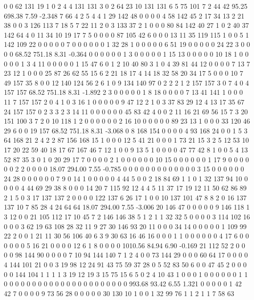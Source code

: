  0 0 62 131 19 1 0 2 4 4 131 131 3 0 2 64 23 10 131 131
 6 5 75 101 7 2 44 42
95.25 698.38 7.59 -2.348
 7 66 4 2 5 4 4 1 29 142 48 0 0 0 0 4 58 142 45 2
 17 34 13 2 21 38 0 0 3 126 113 7 18 5 7 22 11 2 0 3
 133 37 2 1 0 0 0 80 84 142 40 27 1 0 2 40 37 142 64 4
 0 11 34 10 19 17 7 5 0 0 0 0 87 105 42 6 0 0 0 13
 11 35 119 115 1 0 0 5 1 142 109 22 0 0 0 0 0 7 0 0
 0 0 0 0 1 32 28 1 0 0 0 0 0 6 51 19 0 0 0 0
 0 24 22 3 0 0 0 0
68.52 751.18 8.31 -0.364
 0 0 0 0 0 0 1 3 0 0 0 0 0 1 15 13 0 0 0 0
 0 10 18 1 0 0 0 0 0 1 3 4 11 0 0 0 0 0 1 15
 47 6 0 1 2 10 40 80 3 1 0 4 39 81 44 12 0 0 0 0
 7 13 7 23 12 1 0 0 0 25 87 26 62 55 15 6 2 21 18 17
 4 14 18 32 58 20 34 17 5 0 0 0 10 7 49 157 35 8 0 0
 12 140 124 56 2 6 1 0 9 134 140 97 0 2 2 2 1 2 157 157
 3 0 7 4 0 4 157 157
68.52 751.18 8.31 -1.892
 2 3 0 0 0 0 0 1 8 18 0 0 0 0 7 13 41 141 1 0
 0 0 11 7 157 157 2 0 4 1 0 3 16 1 0 0 0 0 0 9
 47 12 2 1 0 3 37 83 29 12 4 13 17 35 67 24 157 157 0 2
 3 3 2 3 14 11 0 0 0 0 0 0 45 83 42 4 0 0 2 11
 16 21 69 56 15 7 3 20 151 100 3 7 2 0 10 118 1 2 0 0
 0 0 0 0 2 16 10 0 0 0 0 0 89 23 13 1 0 0 0 33
 120 46 29 6 0 0 19 157
68.52 751.18 8.31 -3.068
 0 8 168 154 0 0 0 0 4 93 168 24 0 0 1 5 3 64 168 21
 2 4 2 2 87 156 168 15 1 0 0 0 12 5 41 21 0 0 0 1
 73 21 15 3 2 5 12 53 10 17 20 22 59 40 18 17 67 167 46 7
 12 1 0 0 9 13 5 1 0 0 0 0 47 77 42 8 1 0 0 5
 4 13 52 87 35 3 0 1 0 20 29 17 7 0 0 0 0 2 1 0
 0 0 0 0 0 10 15 0 0 0 0 0 0 1 17 9 0 0 0 0
 0 0 2 2 0 0 0 0
18.07 294.00 7.55 -0.785
 0 0 0 0 0 0 0 0 0 0 0 0 0 3 15 0 0 0 0 0
 0 24 28 0 0 0 0 0 0 7 9 0 14 1 0 0 0 0 0 4
 44 5 0 0 2 18 84 69 1 1 0 1 32 137 94 10 0 0 0 0
 4 44 69 29 38 8 0 0 0 14 20 7 115 92 12 4 4 5 11 37
 17 19 12 11 50 62 86 89 2 1 5 0 3 17 137 137 2 0 0 0
 0 122 137 6 26 17 1 0 0 10 137 101 47 8 8 2 0 16 137 137
 10 7 85 28 4 24 64 64
18.07 294.00 7.55 -3.006
 20 146 47 0 0 0 0 0 9 146 118 1 3 12 0 0 21 105 112 17
 10 45 7 2 146 146 38 5 1 2 1 1 32 32 5 0 0 0 0 3
 114 102 16 0 0 0 3 62 19 63 108 28 32 11 9 27 30 146 93 20
 11 0 0 0 34 14 0 0 0 0 0 1 109 99 22 2 0 0 1 21
 11 30 56 106 40 6 3 9 30 63 16 46 16 0 0 0 1 1 0 0
 0 0 0 0 4 17 6 0 0 0 0 0 0 5 16 21 0 0 0 0
 12 6 1 8 0 0 0 0
1010.56 84.94 6.90 -0.169
 21 112 52 2 0 0 0 0 98 144 90 0 0 0 0 7 10 94 144 140
 7 1 2 4 0 0 73 144 29 0 0 0 60 64 17 0 0 0 0 4
 144 101 21 0 0 3 19 98 12 24 91 43 75 59 37 28 0 5 52 83
 50 6 0 0 47 45 2 0 0 0 0 0 144 104 1 1 1 1 3 19
 12 19 3 15 75 15 6 5 0 2 4 10 43 1 0 0 0 1 0 0
 0 0 0 0 1 1 0 0 0 0 0 0 0 0 0 0 0 0 0 0
 0 0 0 0 0 0 0 0
993.68 93.42 6.55 1.321
 0 0 0 0 0 1 42 42 7 0 0 0 0 9 73 56 28 0 0 0
 0 0 30 130 10 1 0 0 1 32 99 76 1 1 2 1 1 7 58 63
